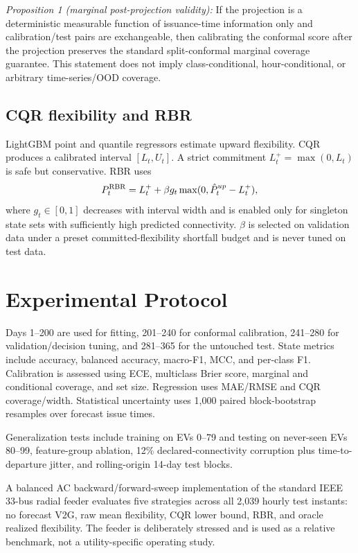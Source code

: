 \documentclass[journal]{IEEEtran}
\begin{document}
\emph{Proposition 1 (marginal post-projection validity):} If the projection is a deterministic measurable function of issuance-time information only and calibration/test pairs are exchangeable, then calibrating the conformal score after the projection preserves the standard split-conformal marginal coverage guarantee. This statement does not imply class-conditional, hour-conditional, or arbitrary time-series/OOD coverage.

\subsection{CQR flexibility and RBR}
LightGBM point and quantile regressors estimate upward flexibility. CQR produces a calibrated interval $[L_t,U_t]$. A strict commitment $L_t^+=\max(0,L_t)$ is safe but conservative. RBR uses
\begin{equation}
P_t^{\rm RBR}=L_t^+ + \beta g_t\max(0,\hat P_t^{up}-L_t^+),
\end{equation}
where $g_t\in[0,1]$ decreases with interval width and is enabled only for singleton state sets with sufficiently high predicted connectivity. $\beta$ is selected on validation data under a preset committed-flexibility shortfall budget and is never tuned on test data.

\section{Experimental Protocol}
Days 1--200 are used for fitting, 201--240 for conformal calibration, 241--280 for validation/decision tuning, and 281--365 for the untouched test. State metrics include accuracy, balanced accuracy, macro-F1, MCC, and per-class F1. Calibration is assessed using ECE, multiclass Brier score, marginal and conditional coverage, and set size. Regression uses MAE/RMSE and CQR coverage/width. Statistical uncertainty uses 1,000 paired block-bootstrap resamples over forecast issue times.

Generalization tests include training on EVs 0--79 and testing on never-seen EVs 80--99, feature-group ablation, 12\% declared-connectivity corruption plus time-to-departure jitter, and rolling-origin 14-day test blocks.

A balanced AC backward/forward-sweep implementation of the standard IEEE 33-bus radial feeder evaluates five strategies across all 2,039 hourly test instants: no forecast V2G, raw mean flexibility, CQR lower bound, RBR, and oracle realized flexibility. The feeder is deliberately stressed and is used as a relative benchmark, not a utility-specific operating study.
\end{document}
